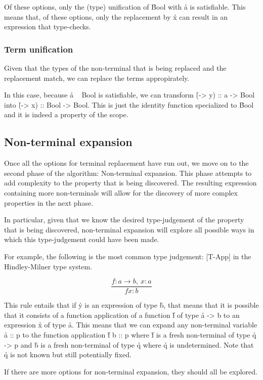 \documentclass[a4paper, 11pt, onepage]{article}
\begin{document}
Of these options, only the (type) unification of \h{Bool} with \h{a} is satisfiable.
This means that, of these options, only the replacement by \h{x} can result in an expression that type-checks.


\subsubsection{Term unification}

Given that the types of the non-terminal that is being replaced and the replacement match, we can replace the terms appropirately.

In this case, because \h{a ~ Bool} is satisfiable, we can transform \h{(\x -> y) :: a -> Bool} into \h{(\x -> x) :: Bool -> Bool}.
This is just the identity function specialized to \h{Bool} and it is indeed a property of the scope.


\subsection{Non-terminal expansion}

Once all the options for terminal replacement have run out, we move on to the second phase of the algorithm: Non-terminal expansion.
This phase attempts to add complexity to the property that is being discovered.
The resulting expression containing more non-terminals will allow for the discovery of more complex properties in the next phase.

In particular, given that we know the desired type-judgement of the property that is being discovered,
non-terminal expansion will explore all possible ways in which this type-judgement could have been made.

For example, the following is the most common type judgement:
[T-App] in the Hindley-Milner type system. \cite{HM}

\[
  \frac{f : a \rightarrow b,\ x : a}{f x : b}
\]

This rule entails that if \h{y} is an expression of type \h{b}, that means that it is possible that it consists of a function application of a function \h{f} of type \h{a -> b} to an expression \h{x} of type \h{a}.
This means that we can expand any non-terminal variable \h{a :: p} to the function application \h{f b :: p} where \h{f} is a fresh non-terminal of type \h{q -> p} and \h{b} is a fresh non-terminal of type \h{q} where \h{q} is undetermined.
Note that \h{q} is not known but still potentially fixed.

If there are more options for non-terminal expansion, they should all be explored.
\end{document}

